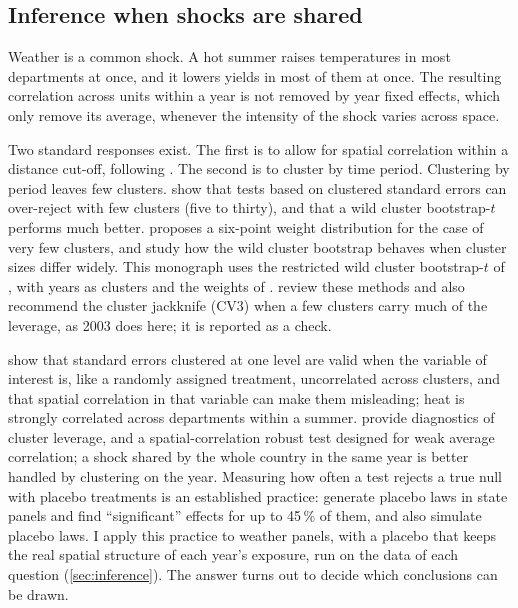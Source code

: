 \subsection{Inference when shocks are shared}

Weather is a common shock. A hot summer raises temperatures in most departments at once, and it lowers yields in most of them at once. The resulting correlation across units within a year is not removed by year fixed effects, which only remove its average, whenever the intensity of the shock varies across space.

Two standard responses exist. The first is to allow for spatial correlation within a distance cut-off, following \textcite{conley1999}. The second is to cluster by time period. Clustering by period leaves few clusters. \textcite{cameron2008} show that tests based on clustered standard errors can over-reject with few clusters (five to thirty), and that a wild cluster bootstrap-$t$ performs much better. \textcite{webb2023} proposes a six-point weight distribution for the case of very few clusters, and \textcite{mackinnon2017} study how the wild cluster bootstrap behaves when cluster sizes differ widely. This monograph uses the restricted wild cluster bootstrap-$t$ of \textcite{cameron2008}, with years as clusters and the weights of \textcite{webb2023}. \textcite{mackinnon2023} review these methods and also recommend the cluster jackknife (CV3) when a few clusters carry much of the leverage, as 2003 does here; it is reported as a check.

\textcite{barrios2012} show that standard errors clustered at one level are valid when the variable of interest is, like a randomly assigned treatment, uncorrelated across clusters, and that spatial correlation in that variable can make them misleading; heat is strongly correlated across departments within a summer. \textcite{mackinnon2023summclust} provide diagnostics of cluster leverage, and \textcite{muller2022} a spatial-correlation robust test designed for weak average correlation; a shock shared by the whole country in the same year is better handled by clustering on the year. Measuring how often a test rejects a true null with placebo treatments is an established practice: \textcite{bertrand2004} generate placebo laws in state panels and find ``significant'' effects for up to 45\,\% of them, and \textcite{mackinnon2017} also simulate placebo laws. I apply this practice to weather panels, with a placebo that keeps the real spatial structure of each year's exposure, run on the data of each question (\cref{sec:inference}). The answer turns out to decide which conclusions can be drawn.

